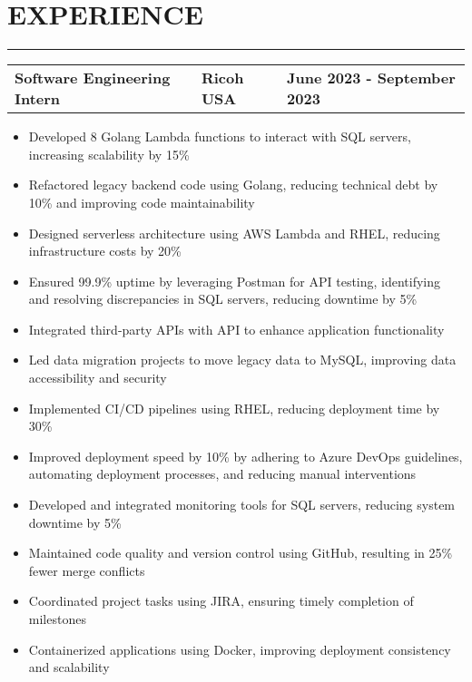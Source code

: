 \documentclass[a4paper,10pt]{article}
\begin{document}
\section*{\large EXPERIENCE}
\vspace{-18pt}
\noindent\rule{\textwidth}{0.4pt}
\vspace{5pt}
\begin{tabularx}{\textwidth}{@{} >{\raggedright\arraybackslash}X >{\centering\arraybackslash}X >{\raggedleft\arraybackslash}X @{} }
\textbf{Software Engineering Intern} & \textbf{Ricoh USA} & \textbf{June 2023 - September 2023} \\
\end{tabularx}
\begin{itemize}[leftmargin=*,label=\textbullet]
  \item Developed 8 Golang Lambda functions to interact with SQL servers, increasing scalability by 15\%
  \item Refactored legacy backend code using Golang, reducing technical debt by 10\% and improving code maintainability
  \item Designed serverless architecture using AWS Lambda and RHEL, reducing infrastructure costs by 20\%
  \item Ensured 99.9\% uptime by leveraging Postman for API testing, identifying and resolving discrepancies in SQL servers, reducing downtime by 5\%
  \item Integrated third-party APIs with API to enhance application functionality
  \item Led data migration projects to move legacy data to MySQL, improving data accessibility and security
  \item Implemented CI/CD pipelines using RHEL, reducing deployment time by 30\%
  \item Improved deployment speed by 10\% by adhering to Azure DevOps guidelines, automating deployment processes, and reducing manual interventions
  \item Developed and integrated monitoring tools for SQL servers, reducing system downtime by 5\%
  \item Maintained code quality and version control using GitHub, resulting in 25\% fewer merge conflicts
  \item Coordinated project tasks using JIRA, ensuring timely completion of milestones
  \item Containerized applications using Docker, improving deployment consistency and scalability
\end{itemize}
\end{document}
